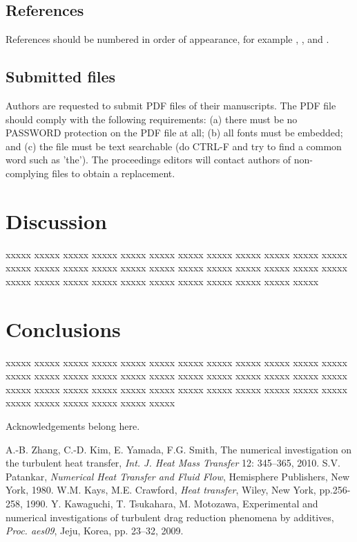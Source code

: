 \documentclass{article}
\begin{document}
\subsection{References}

References should be numbered in order of appearance, for example \cite{Zhang10}, \cite{Patankar80}, and \cite{Kays90,Kawa09}. 

\subsection{Submitted files}
Authors are requested to submit PDF files of their manuscripts. 
The PDF file should comply with the following requirements: 
(a) there must be no PASSWORD protection on the PDF file at all; 
(b) all fonts must be embedded; 
and (c) the file must be text searchable (do CTRL-F and try to find a common word such as 'the'). 
The proceedings editors will contact authors of non-complying files to obtain a replacement.

\section{Discussion}

xxxxx xxxxx xxxxx xxxxx xxxxx xxxxx xxxxx
xxxxx xxxxx xxxxx xxxxx xxxxx xxxxx xxxxx
xxxxx xxxxx xxxxx xxxxx xxxxx xxxxx xxxxx
xxxxx xxxxx xxxxx xxxxx xxxxx xxxxx xxxxx
xxxxx xxxxx xxxxx xxxxx xxxxx xxxxx xxxxx

\section{Conclusions}

xxxxx xxxxx xxxxx xxxxx xxxxx xxxxx xxxxx
xxxxx xxxxx xxxxx xxxxx xxxxx xxxxx xxxxx
xxxxx xxxxx xxxxx xxxxx xxxxx xxxxx xxxxx
xxxxx xxxxx xxxxx xxxxx xxxxx xxxxx xxxxx
xxxxx xxxxx xxxxx xxxxx xxxxx xxxxx xxxxx
xxxxx xxxxx xxxxx xxxxx xxxxx xxxxx xxxxx

\begin{acknowledgement}
Acknowledgements belong here.
\end{acknowledgement}



\begin{thebibliography}{10}
A.-B. Zhang, C.-D. Kim, E. Yamada, F.G. Smith, 
The numerical investigation on the turbulent heat transfer, 
{\em Int. J. Heat Mass Transfer} 12: 345--365, 2010.
S.V. Patankar, 
{\em Numerical Heat Transfer and Fluid Flow}, 
Hemisphere Publishers, New York, 1980.
W.M. Kays, M.E. Crawford, 
{\em Heat transfer}, 
Wiley, New York, pp.256-258, 1990.
Y. Kawaguchi, T. Tsukahara, M. Motozawa, 
Experimental and numerical investigations of turbulent drag reduction phenomena by additives,
{\em Proc. aes09},
Jeju, Korea, pp. 23--32, 2009.
\end{thebibliography}
\end{document}
